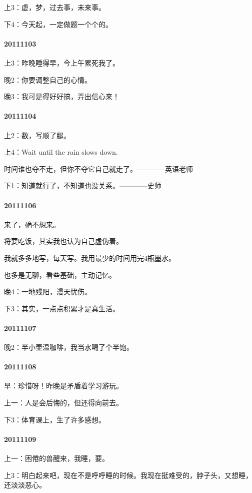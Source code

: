 \documentclass[UTF8]{Diaries}
\begin{document}
上3：虚，梦，过去事，未来事。

下4：今天起，一定做题一个个的。


\paragraph{20111103}
上3：昨晚睡得早，今上午累死我了。

晚2：你要调整自己的心情。

晚3：我可是得好好搞，弄出信心来！


\paragraph{20111104}
上2：数，写顺了腿。

上4：Wait until the rain slows down.

时间谁也夺不走，但你不夺它自己就走了。————英语老师

下1：知道就行了，不知道也没关系。————史师


\paragraph{20111106}
来了，确不想来。

将要吃饭，其实我也认为自己虚伪着。

我就多多地写，每天写。我用最少的时间用完4瓶墨水。

也多是无聊，看些基础，主动记忆。

晚4：一地残阳，漫天忧伤。

下3：其实，一点点积累才是真生活。


\paragraph{20111107}
晚2：半小壶温咖啡，我当水喝了个半饱。


\paragraph{20111108}
早：珍惜呀！昨晚是矛盾着学习游玩。

上一：人是会后悔的，但还得向前去。

下3：体育课上，生了许多感想。


\paragraph{20111109}
上一：困倦的兽醒来，我睡，要。

上3：明白起来吧，现在不是呼呼睡的时候。我现在挺难受的，脖子头，又想睡，还淡淡恶心。
\end{document}
